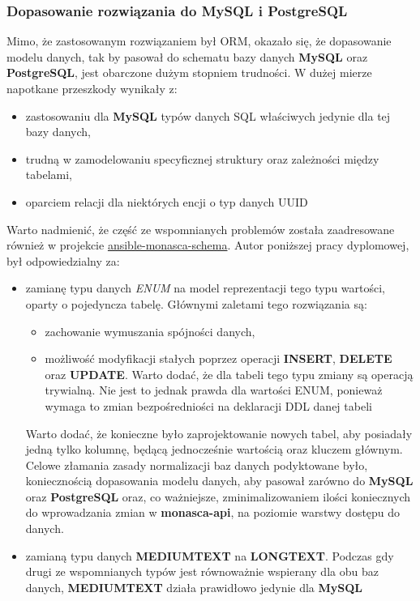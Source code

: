     \subsubsection{Dopasowanie rozwiązania do MySQL i PostgreSQL}
    Mimo, że zastosowanym rozwiązaniem był ORM, okazało się, że dopasowanie modelu danych, tak by pasował do 
    schematu bazy danych \textbf{MySQL} oraz \textbf{PostgreSQL}, jest obarczone dużym stopniem trudności. 
    W dużej mierze napotkane przeszkody wynikały z:
    \begin{itemize}
        \item zastosowaniu dla \textbf{MySQL} typów danych SQL właściwych jedynie dla tej bazy danych,
        \item trudną w zamodelowaniu specyficznej struktury oraz zależności między tabelami,
        \item oparciem relacji dla niektórych encji o typ danych UUID
    \end{itemize}
    
    Warto nadmienić, że część ze wspomnianych problemów została zaadresowane również
    w projekcie \href{https://github.com/FujitsuEnablingSoftwareTechnologyGmbH/ansible-monasca-schema}{ansible-monasca-schema}.
    Autor poniższej pracy dyplomowej, był odpowiedzialny za:
    \begin{itemize}
        \item zamianę typu danych \textit{ENUM} na model reprezentacji tego typu wartości, oparty
        o pojedyncza tabelę. Głównymi zaletami tego rozwiązania są:
        \begin{itemize}
            \item zachowanie wymuszania spójności danych,
            \item możliwość modyfikacji stałych poprzez operacji \textbf{INSERT}, \textbf{DELETE} oraz \textbf{UPDATE}. Warto
            dodać, że dla tabeli tego typu zmiany są operacją trywialną. Nie jest to jednak prawda dla wartości ENUM, ponieważ
            wymaga to zmian bezpośredniości na deklaracji DDL danej tabeli
        \end{itemize}
        Warto dodać, że konieczne było zaprojektowanie nowych tabel, aby posiadały jedną tylko kolumnę, będącą jednocześnie
        wartością oraz kluczem głównym. Celowe złamania zasady normalizacji baz danych podyktowane było, koniecznością
        dopasowania modelu danych, aby pasował zarówno do \textbf{MySQL} oraz \textbf{PostgreSQL} oraz, co ważniejsze,
        zminimalizowaniem ilości koniecznych do wprowadzania zmian w \textbf{monasca-api}, na poziomie warstwy dostępu do danych.
        \item zamianą typu danych \textbf{MEDIUMTEXT} na \textbf{LONGTEXT}. Podczas gdy drugi ze wspomnianych typów jest równoważnie
        wspierany dla obu baz danych, \textbf{MEDIUMTEXT} działa prawidłowo jedynie dla \textbf{MySQL}
    \end{itemize}
    
